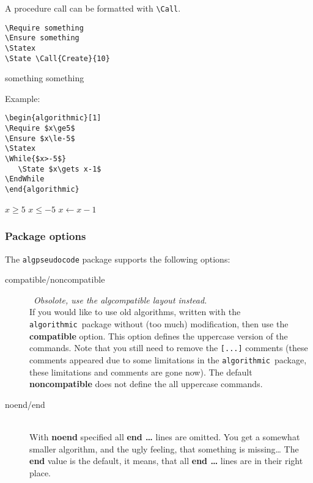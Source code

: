 \documentclass{article}
\newcommand{\old}{\texttt{algorithmic}}
\newcommand\ASTART{\bigskip\noindent\begin{minipage}[b]{0.5\linewidth}}
\newcommand\ACONTINUE{\end{minipage}\begin{minipage}[b]{0.5\linewidth}}
\newcommand\AENDSKIP{\end{minipage}\bigskip}
\newcommand\AEND{\end{minipage}}
\begin{document}
A procedure call can be formatted with \verb:\Call:.

\ASTART
\begin{verbatim}
\Require something
\Ensure something
\Statex
\State \Call{Create}{10}
\end{verbatim}
\ACONTINUE
\begin{algorithmic}[1]
\Require something
\Ensure something
\Statex
\State {}
\end{algorithmic}
\AENDSKIP

\noindent Example:

\ASTART
\begin{verbatim}
\begin{algorithmic}[1]
\Require $x\ge5$
\Ensure $x\le-5$
\Statex
\While{$x>-5$}
   \State $x\gets x-1$
\EndWhile
\end{algorithmic}
\end{verbatim}
\ACONTINUE
\begin{algorithmic}[1]
\Require $x\ge5$
\Ensure $x\le-5$
\Statex
{}
   \State $x\gets x-1$
\EndWhile
\Statex
\end{algorithmic}
\AEND





\subsubsection{Package options}\label{algpseudocode package options}

The \texttt{algpseudocode} package supports the following options:

\begin{description}
\item[compatible/noncompatible]\ \textit{Obsolote, use the algcompatible layout instead.}\\
If you would like to use old 
algorithms, written with the \old\ package without (too much) 
modification, then use the \textbf{compatible} option. This option 
defines the uppercase version of the commands. Note that you still need 
to remove the \verb:[...]: comments (these comments appeared due to some 
limitations in the \old\ package, these limitations and comments are gone now).
The default \textbf{noncompatible} does not define the all uppercase 
commands.
\item[noend/end]\ \\With \textbf{noend} specified all \textbf{end \dots} 
lines are omitted. You get a somewhat smaller algorithm, and the ugly 
feeling, that something is missing\dots{} The \textbf{end} value is the 
default, it means, that all \textbf{end \dots} lines are in their right 
place.
\end{description}
\end{document}
